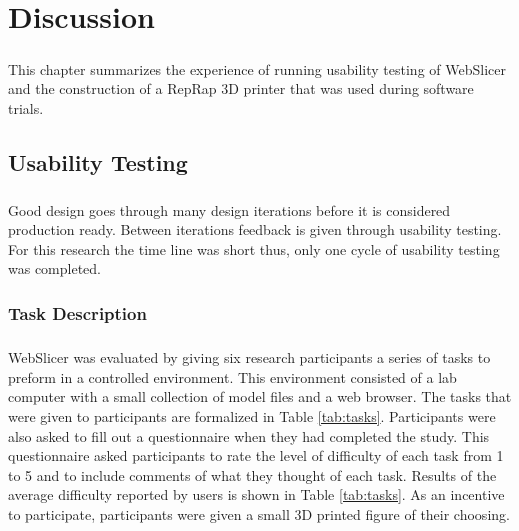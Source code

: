 \chapter{Discussion}
\paragraph{}
This chapter summarizes the experience of running usability testing of WebSlicer and the construction of a RepRap 3D printer that was used during software trials.

\section{Usability Testing}
\paragraph{}
Good design goes through many design iterations before it is considered production ready. 
Between iterations feedback is given through usability testing. 
For this research the time line was short thus, only one cycle of usability testing was completed.

\subsection{Task Description}
\paragraph{}
WebSlicer was evaluated by giving six research participants a series of tasks to preform in a controlled environment.
This environment consisted of a lab computer with a small collection of model files and a web browser.
The tasks that were given to participants are formalized in Table \ref{tab:tasks}.
Participants were also asked to fill out a questionnaire when they had completed the study.
This questionnaire asked participants to rate the level of difficulty of each task from 1 to 5 and to include comments of what they thought of each task.
Results of the average difficulty reported by users is shown in Table \ref{tab:tasks}.
As an incentive to participate, participants were given a small 3D printed figure of their choosing.

